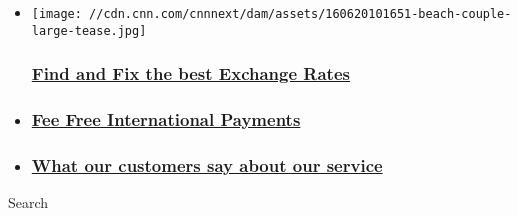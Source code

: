 \begin{itemize}
\item
  \href{https://www.cnnmoneytransfers.com/our-services/?utm_source=cnni\&utm_medium=Regions-PZ\&utm_campaign=Campaign2}{}

  \texttt{[image: //cdn.cnn.com/cnnnext/dam/assets/160620101651-beach-couple-large-tease.jpg]}

  \hypertarget{find-and-fix-the-best-exchange-rates}{%
  \subsubsection{\texorpdfstring{\href{https://www.cnnmoneytransfers.com/our-services/?utm_source=cnni\&utm_medium=Regions-PZ\&utm_campaign=Campaign2}{Find
  and Fix the best Exchange
  Rates}}{Find and Fix the best Exchange Rates}}\label{find-and-fix-the-best-exchange-rates}}
\item
  \hypertarget{fee-free-international-payments}{%
  \subsubsection{\texorpdfstring{\href{https://www.cnnmoneytransfers.com/?utm_source=cnni\&utm_medium=Regions-PZ\&utm_campaign=Campaign3}{Fee
  Free International
  Payments}}{Fee Free International Payments}}\label{fee-free-international-payments}}
\item
  \hypertarget{what-our-customers-say-about-our-service}{%
  \subsubsection{\texorpdfstring{\href{https://www.cnnmoneytransfers.com/customer-testimonials/?utm_source=cnni\&utm_medium=Regions-PZ\&utm_campaign=Campaign4}{What
  our customers say about our
  service}}{What our customers say about our service}}\label{what-our-customers-say-about-our-service}}
\end{itemize}

Search

